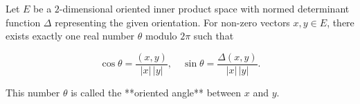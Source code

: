 Let \(E\) be a \(2\)-dimensional oriented inner product space with normed determinant function \(\Delta\) representing the given orientation. For non-zero vectors \(x, y \in E\), there exists exactly one real number \(\theta\) modulo \(2\pi\) such that

$$\cos \theta = \frac{(x, y)}{|x| \, |y|}, \quad \sin \theta = \frac{\Delta(x, y)}{|x| \, |y|}.$$

This number \(\theta\) is called the **oriented angle** between \(x\) and \(y\).
